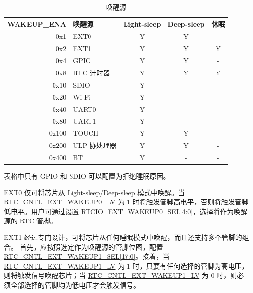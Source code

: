 \begin{table}[H]
    \centering
    \caption{唤醒源}
    \label{tab:lpm-wakeup-source}
    \begin{threeparttable}
    \begin{tabular}{| r | l | c | c | c |}
    \hline
    \rowcolor{lightgray}
    \textbf{WAKEUP\_ENA} & \textbf{唤醒源\tnote{1}} &  \textbf{Light-sleep} & \textbf{Deep-sleep} & \textbf{休眠} \\\hline
        0x1 & EXT0\tnote{2} & Y & Y & - \\\hline
        0x2 & EXT1\tnote{3} & Y & Y & Y \\\hline
        0x4 & GPIO\tnote{4} & Y & Y & - \\\hline
        0x8 & RTC 计时器 & Y & Y & Y \\\hline
        0x10 & SDIO\tnote{5} & Y & - & - \\\hline
        0x20 & Wi-Fi\tnote{6} & Y & - & - \\\hline
        0x40 & UART0 \tnote{7}& Y & - & - \\\hline
        0x80 & UART1 \tnote{7} & Y & - & - \\\hline
        0x100 & TOUCH & Y & Y & - \\\hline
        0x200 & ULP 协处理器 & Y & Y & - \\\hline
        0x400 & BT \tnote{6}& Y & - & -  \\\hline
    \end{tabular}
    \begin{tablenotes}
        \item[1] 表格中只有 GPIO 和 SDIO 可以配置为拒绝睡眠原因。
        \item[2] EXT0 仅可将芯片从 Light-sleep/Deep-sleep 模式中唤醒。当 \hyperref[regdesc:RTCCNTLEXTWAKEUPCONFREG]{RTC\_CNTL\_EXT\_WAKEUP0\_LV} 为 1 时将触发管脚高电平，否则将触发管脚低电平。用户可通过设置 \hyperref[regdesc:RTCIOEXTWAKEUP0REG]{RTCIO\_EXT\_WAKEUP0\_SEL[4:0]}，选择将作为唤醒源的 RTC 管脚。
        \item[3] EXT1 经过专门设计，可将芯片从任何睡眠模式中唤醒，而且还支持多个管脚的组合。 首先，应按照选定作为唤醒源的管脚位图，配置 \hyperref[regdesc:RTCCNTLEXTWAKEUP1REG]{RTC\_CNTL\_EXT\_WAKEUP1\_SEL[17:0]}。接着，当 \hyperref[regdesc:RTCCNTLEXTWAKEUPCONFREG]{RTC\_CNTL\_EXT\_WAKEUP1\_LV} 为 1 时，只要有任何选择的管脚为高电压，则将触发信号唤醒芯片；当 \hyperref[regdesc:RTCCNTLEXTWAKEUPCONFREG]{RTC\_CNTL\_EXT\_WAKEUP1\_LV} 为 0 时，则必须全部选择的管脚均为低电压才会触发信号。


\end{tablenotes}
\end{threeparttable}
\end{table}
